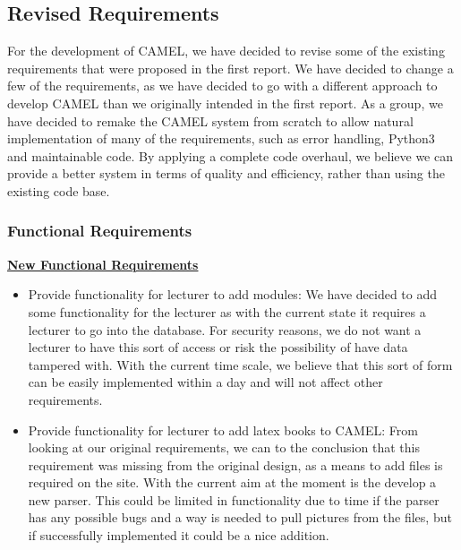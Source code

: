 \subsection{Revised Requirements}
	For the development of CAMEL, we have decided to revise some of the existing requirements that were proposed in the first report. We have decided to change a few of the requirements, as we have decided to go with a different approach to develop CAMEL than we originally intended in the first report. As a group, we have decided to remake the CAMEL system from scratch to allow natural implementation of many of the requirements, such as error handling, Python3 and maintainable code. By applying a complete code overhaul, we believe we can provide a better system in terms of quality and efficiency, rather than using the existing code base.\\    
	
	\subsubsection{Functional Requirements}
	\underline{\textbf{New Functional Requirements}}
	\begin{itemize}
		\item Provide functionality for lecturer to add modules: We have decided to add some functionality for the lecturer as with the current state it requires a lecturer to go into the database. For security reasons, we do not want a lecturer to have this sort of access or risk the possibility of have data tampered with. With the current time scale, we believe that this sort of form can be easily implemented within a day and will not affect other requirements. 
		
		\item Provide functionality for lecturer to add latex books to CAMEL: From looking at our original requirements, we can to the conclusion that this requirement was missing from the original design, as a means to add files is required on the site. With the current aim at the moment is the develop a new parser. This could be limited in functionality due to time if the parser has any possible bugs and a way is needed to pull pictures from the files, but if successfully implemented it could be a nice addition.
	\end{itemize}
	
